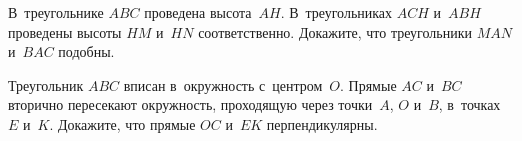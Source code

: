 \begin{problems}
\item
В~треугольнике $ABC$ проведена высота~$AH$.
В~треугольниках $ACH$ и~$ABH$ проведены высоты $HM$ и~$HN$ соответственно.
Докажите, что треугольники $MAN$ и~$BAC$ подобны.

\item
Треугольник $ABC$ вписан в~окружность с~центром~$O$.
Прямые $AC$ и~$BC$ вторично пересекают окружность, проходящую через точки~$A$,
$O$ и~$B$, в~точках $E$ и~$K$.
Докажите, что прямые $OC$ и~$EK$ перпендикулярны.

\end{problems}

